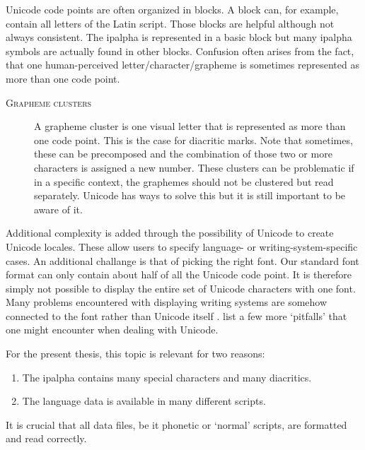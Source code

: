 Unicode code points are often organized in blocks. A block can, for example, contain all letters of the Latin script. Those blocks are helpful although not always consistent. The \ac{ipalpha} is represented in a basic block but many \ac{ipalpha} symbols are actually found in other blocks. Confusion often arises from the fact, that one human-perceived letter/character/grapheme is sometimes represented as more than one code point. 

\begin{description}
\item[\textsc{Grapheme clusters}] A grapheme cluster is one visual letter that is represented as more than one code point. This is the case for diacritic marks. Note that sometimes, these can be precomposed and the combination of those two or more characters is assigned a new number. These clusters can be problematic if in a specific context, the graphemes should not be clustered but read separately. Unicode has ways to solve this but it is still important to be aware of it.
\end{description} 

Additional complexity is added through the possibility of Unicode to create Unicode locales. These allow users to specify language- or writing-system-specific cases. An additional challange is that of picking the right font. Our standard font format can only contain about half of all the Unicode code point. It is therefore simply not possible to display the entire set of Unicode characters with one font. Many problems encountered with displaying writing systems are somehow connected to the font rather than Unicode itself \citep{unicode-lingu}. \citet{unicode-lingu} list a few more `pitfalls' that one might encounter when dealing with Unicode.

For the present thesis, this topic is relevant for two reasons: 
\begin{enumerate}
\item The \ac{ipalpha} contains many special characters and many diacritics.
\item The language data is available in many different scripts.
\end{enumerate} 

It is crucial that all data files, be it phonetic or `normal' scripts, are formatted and read correctly.

